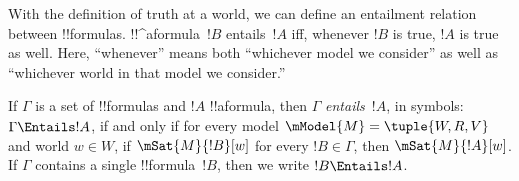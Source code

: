 \documentclass[../../../include/open-logic-section]{subfiles}
\begin{document}


\begin{explain}
  With the definition of truth at a world, we can define an entailment
  relation between !!{formula}s. !!^a{formula}~$!B$ entails~$!A$ iff,
  whenever $!B$ is true, $!A$ is true as well. Here, ``whenever''
  means both ``whichever model we consider'' as well as ``whichever
  world in that model we consider.''
\end{explain}

\begin{defn}
  If $\Gamma$ is a set of !!{formula}s and $!A$ !!a{formula}, then
  $\Gamma$ \emph{entails}~$!A$, in symbols: $\Gamma \Entails !A$, if
  and only if for every model $\mModel{M} = \tuple{W, R, V}$ and world
  $w \in W$, if $\mSat{M}{!B}[w]$ for every $!B \in \Gamma$, then
  $\mSat{M}{!A}[w]$. If $\Gamma$ contains a single !!{formula}~$!B$,
  then we write $!B \Entails !A$.
\end{defn}
\end{document}
